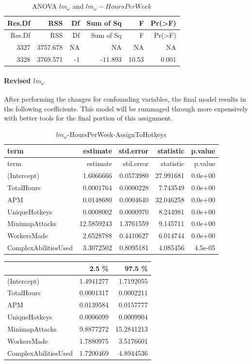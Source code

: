 \documentclass[]{article}
\let\oldparagraph\paragraph
\renewcommand{\paragraph}[1]{\oldparagraph{#1}\mbox{}}
\begin{document}
\begin{longtable}[]{@{}rrrrrr@{}}
\caption{ANOVA \(lm_\omega\) and
\(lm_\omega-HoursPerWeek\)}\tabularnewline
\toprule
Res.Df & RSS & Df & Sum of Sq & F & Pr(\textgreater{}F)\tabularnewline
\midrule
\endfirsthead
\toprule
Res.Df & RSS & Df & Sum of Sq & F & Pr(\textgreater{}F)\tabularnewline
\midrule
\endhead
3327 & 3757.678 & NA & NA & NA & NA\tabularnewline
3328 & 3769.571 & -1 & -11.893 & 10.53 & 0.001\tabularnewline
\bottomrule
\end{longtable}

\hypertarget{revised-lm_omega}{%
\paragraph{\texorpdfstring{Revised
\(lm_\omega\)}{Revised lm\_\textbackslash{}omega}}\label{revised-lm_omega}}

After performing the changes for confounding variables, the final model
results in the following coefficients. This model will be rummaged
through more expensively with better tools for the final portion of this
assignment.

\begin{longtable}[]{@{}lrrrr@{}}
\caption{\(lm_\omega\)-HoursPerWeek-AssignToHotkeys}\tabularnewline
\toprule
term & estimate & std.error & statistic & p.value\tabularnewline
\midrule
\endfirsthead
\toprule
term & estimate & std.error & statistic & p.value\tabularnewline
\midrule
\endhead
(Intercept) & 1.6066666 & 0.0573980 & 27.991681 & 0.0e+00\tabularnewline
TotalHours & 0.0001764 & 0.0000228 & 7.743549 & 0.0e+00\tabularnewline
APM & 0.0148680 & 0.0004640 & 32.046258 & 0.0e+00\tabularnewline
UniqueHotkeys & 0.0008002 & 0.0000970 & 8.244981 &
0.0e+00\tabularnewline
MinimapAttacks & 12.5859243 & 1.3761559 & 9.145711 &
0.0e+00\tabularnewline
WorkersMade & 2.6528788 & 0.4410627 & 6.014744 & 0.0e+00\tabularnewline
ComplexAbilitiesUsed & 3.3072502 & 0.8095181 & 4.085456 &
4.5e-05\tabularnewline
\bottomrule
\end{longtable}

\begin{longtable}[]{@{}lrr@{}}
\toprule
& 2.5 \% & 97.5 \%\tabularnewline
\midrule
\endhead
(Intercept) & 1.4941277 & 1.7192055\tabularnewline
TotalHours & 0.0001317 & 0.0002211\tabularnewline
APM & 0.0139584 & 0.0157777\tabularnewline
UniqueHotkeys & 0.0006099 & 0.0009904\tabularnewline
MinimapAttacks & 9.8877272 & 15.2841213\tabularnewline
WorkersMade & 1.7880975 & 3.5176601\tabularnewline
ComplexAbilitiesUsed & 1.7200469 & 4.8944536\tabularnewline
\bottomrule
\end{longtable}
\end{document}
